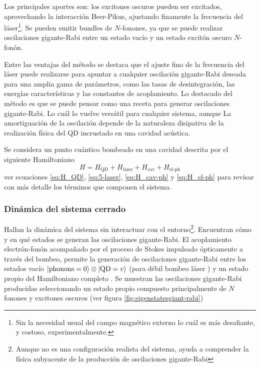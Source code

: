 \documentclass[../main.tex]{subfiles}
\begin{document}
Los principales aportes son: los excitones oscuros pueden ser excitados, aprovechando la interacción Beer-Pikus, ajustando finamente la frecuencia del láser\footnote{Sin la necesidad usual del campo magnético externo \parencite{Jimenez2017} lo cuál es más desafiante, y costoso, experimentalmente.}. Se pueden emitir bundles de $N$-fonones, ya que se puede realizar oscilaciones gigante-Rabi entre un estado vacío y un estado excitón oscuro $N$-fonón.

Entre las ventajas del método se destaca que el ajuste fino de la frecuencia del láser puede realizarse para apuntar a cualquier oscilación gigante-Rabi deseada para una amplia gama de parámetros, como las tasas de desintegración, las energías características y las constantes de acoplamiento. Lo destacado del método es que se puede pensar como una receta para generar oscilaciones gigante-Rabi. Lo cuál lo vuelve versátil para cualquier sistema, aunque La amortiguación de la oscilación depende de la naturaleza disipativa de la realización física del QD incrustado en una cavidad acústica.

Se considera un punto cuántico bombeado en una cavidad descrita por el siguiente Hamiltoniano \parencite{Bin2020}
\begin{equation}
	H = H_\text{QD} + H_\text{láser} + H_\text{cav} + H_\text{el-ph}
\end{equation}
ver ecuaciones \ref{eq:H_QD}, \ref{eq:5-laser}, \ref{eq:H_cav-ph} y \ref{eq:H_el-ph} para revisar con más detalle los términos que componen el sistema.

\subsubsection{Dinámica del sistema cerrado}
Hallan la dinámica del sistema sin interactuar con el entorno\footnote{Aunque no es una configuración realista del sistema, ayuda a comprender la física subyacente de la producción de oscilaciones gigante-Rabi}. Encuentran cómo y en qué estados se generan las oscilaciones gigante-Rabi. El acoplamiento electrón-fonón acompañado por el proceso de Stokes impulsado ópticamente a través del bombeo, permite la generación de oscilaciones gigante-Rabi entre los estados vacío $\ket{\text{phonons}=0}\otimes \ket{\text{QD}=v}$ (para débil bombeo láser ) y un estado propio del Hamiltoniano completo \parencite{Bin2020}. Se muestran las oscilaciones gigante-Rabi producidas seleccionando un estado propio compuesto principalmente de $N$ fonones y excitones oscuros (ver figura \ref{fig:eigenstatesgiant-rabi})
\end{document}
